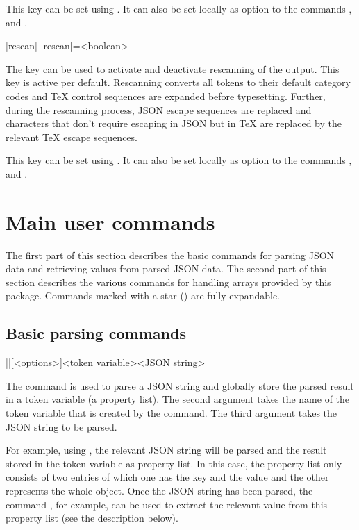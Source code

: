 \documentclass[a4paper]{article}
\begin{document}
{{This key can be set using \macro{\JSONParseSet}. It can also be set locally as option to the commands \macro{\JSONParseValue}, \macro{\JSONParseArrayUse} and \macro{\JSONParseArrayMapFunction}.

\begin{macrodef}
|rescan|
|rescan|={<boolean>}
\end{macrodef}
The key  can be used to activate and deactivate rescanning of the output. This key is active per default. Rescanning converts all tokens to their default category codes and TeX control sequences are expanded before typesetting. Further, during the rescanning process, JSON escape sequences are replaced and characters that don't require escaping in JSON but in TeX are replaced by the relevant TeX escape sequences.

This key can be set using \macro{\JSONParseSet}. It can also be set locally as option to the commands \macro{\JSONParseValue}, \macro{\JSONParseArrayUse} and \macro{\JSONParseArrayMapFunction}.

\section{Main user commands}

The first part of this section describes the basic commands for parsing JSON data and retrieving values from parsed JSON data. The second part of this section describes the various commands for handling arrays provided by this package. Commands marked with a star (\expandablestar) are fully expandable.

\subsection{Basic parsing commands}

\begin{macrodef}
|\JSONParse|[<options>]{<token variable>}{<JSON string>}
\end{macrodef}
The command \macro{\JSONParse} is used to parse a JSON string and globally store the parsed result in a token variable (a property list). The second argument takes the name of the token variable that is created by the command. The third argument takes the JSON string to be parsed.

For example, using , the relevant JSON string will be parsed and the result stored in the token variable \macro{\myJSONdata} as property list. In this case, the property list only consists of two entries of which one has the key  and the value  and the other represents the whole object. Once the JSON string has been parsed, the command , for example, can be used to extract the relevant value from this property list (see the description below).

}}
\end{document}

